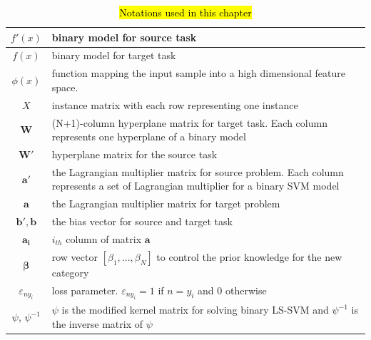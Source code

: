 \begin{table}
	\centering
	\caption{\hl{Notations used in this chapter}}
	\begin{tabular}{|c|L{14cm}|}
		\hline
		$f'(x)$ & binary model for source task \\
		\hline
		$f(x)$  & binary model for target task \\
		\hline
		$\phi(x)$ &  function mapping the input sample into a high dimensional feature space. \\ \hline
		$X$     & instance matrix with each row representing one instance \\\hline
		$\boldsymbol{W} $    & (N+1)-column hyperplane matrix for target task. Each column represents one hyperplane of a binary model \\\hline
		$\boldsymbol{W'}$    & hyperplane matrix for the source task \\\hline
		$\boldsymbol{a'} $   & the Lagrangian multiplier matrix for source problem. Each column represents a set of Lagrangian multiplier for a binary SVM model \\\hline
		$\boldsymbol{a} $    & the Lagrangian multiplier matrix for target problem \\
		\hline
		$\boldsymbol{b'},\boldsymbol{b}$  & the bias vector for source and target task \\
		\hline
		$\boldsymbol{a_i}$ & $i_{th}$ column of matrix $\boldsymbol{a}$ \\ \hline
		$\boldsymbol{\beta}$ & row vector $\left[ {{\beta _1},...,{\beta _N}} \right]$ to control the prior knowledge for the new category\\ \hline
		$\varepsilon_{ny_i}$&loss parameter. $\varepsilon _{n{y_i}}=1$ if $n=y_i$ and 0 otherwise\\ \hline
		$\psi$, $\psi^{-1}$ & $\psi$ is the modified kernel matrix for solving binary LS-SVM and $\psi^{-1}$ is the inverse matrix of $\psi$\\ \hline
	\end{tabular}%
	\label{tab:single:notation}%
\end{table}%

